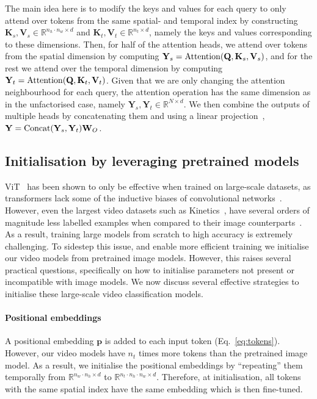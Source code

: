 The main idea here is to modify the keys and values for each query to only attend over tokens from the same spatial- and temporal index by constructing $\mathbf{K}_s, \mathbf{V}_s \in \mathbb{R}^{n_h \cdot n_w \times d}$ and $\mathbf{K}_t, \mathbf{V}_t \in \mathbb{R}^{n_t \times d}$, namely the keys and values corresponding to these dimensions. Then, for half of the attention heads, we attend over tokens from the spatial dimension by computing $\mathbf{Y}_s = \operatorname{Attention}(\mathbf{Q}, \mathbf{K}_s, \mathbf{V}_s)$, and for the rest we attend over the temporal dimension by computing $\mathbf{Y}_t = \operatorname{Attention}(\mathbf{Q}, \mathbf{K}_t, \mathbf{V}_t)$.
Given that we are only changing the attention neighbourhood for each query, the attention operation has the same dimension as in the unfactorised case, namely $\mathbf{Y}_s, \mathbf{Y}_t \in \mathbb{R}^{N \times d}$. 
We then combine the outputs of multiple heads by concatenating them and using a linear projection~\cite{vaswani_neurips_2017}, 
$\mathbf{Y} = \operatorname{Concat}(\mathbf{Y}_s, \mathbf{Y}_t) \mathbf{W}_O$.






\subsection{Initialisation by leveraging pretrained models}
\label{sec:method_initialisation}

ViT~\cite{dosovitskiy_iclr_2021} has been shown to only be effective when trained on large-scale datasets, as transformers lack some of the inductive biases of convolutional networks~\cite{dosovitskiy_iclr_2021}. %
However, even the largest video datasets such as Kinetics~\cite{kay_arxiv_2017}, have several orders of magnitude less labelled examples when compared to their image counterparts~\cite{deng_cvpr_2009, kuznetsova_ijcv_2020, sun_iccv_2017}.
As a result, training large models from scratch to high accuracy is extremely challenging.
To sidestep this issue, and enable more efficient training we initialise our video models from pretrained image models.
However, this raises several practical questions, specifically on how to initialise parameters not present or incompatible with image models.
We now discuss several effective strategies to initialise these large-scale video classification models.

\paragraph{Positional embeddings}
A positional embedding $\mathbf{p}$ is added to each input token (Eq.~\ref{eq:tokens}).
However, our video models have $n_t$ times more tokens than the pretrained image model. As a result, we initialise the positional embeddings by ``repeating'' them temporally from $\mathbb{R}^{n_w \cdot n_h \times d}$ to $\mathbb{R}^{n_t \cdot n_h \cdot n_w \times d}$.
Therefore, at initialisation, all tokens with the same spatial index have the same embedding which is then fine-tuned.


